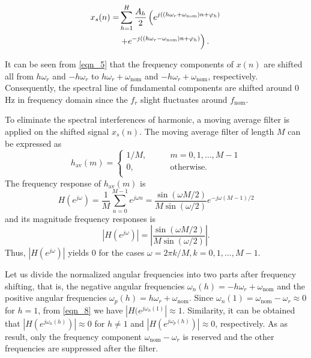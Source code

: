 \documentclass[journal,twoside]{IEEEtran}
\begin{document}
\begin{align}%
x_s(n)=&\sum_{h=1}^{H}\dfrac{A_h}{2}\left(e^{j\left((h\omega_r+\omega_\mathrm{nom})n+\varphi_h\right)}\right.\notag\\
&\left.+e^{-j\left((h\omega_r -\omega_\mathrm{nom})n+\varphi_h\right)}\right).\label{eqn_5}
\end{align}

It can be seen from  \eqref{eqn_5} that the frequency components of $x(n)$ are shifted all from $h\omega_r$ and $-h\omega_r$ to $h\omega_r+\omega_\mathrm{nom}$ and $-h\omega_r+\omega_\mathrm{nom}$, respectively. Consequently, the spectral line of fundamental components are shifted around 0 Hz in frequency domain since the $f_r$ slight fluctuates around $f_\mathrm{nom}$.

To eliminate the spectral interferences of harmonic, a moving average filter is applied on the shifted signal $x_s(n)$. The  moving average filter of length $M$ can be expressed as 
\begin{equation}
h_\mathrm{av}(m)=\begin{cases}
1/M,\qquad &m=0,1,\ldots,M-1\\
0, &\text{otherwise.}\\
\end{cases}\label{eqn_6}
\end{equation}
The frequency response of $h_\mathrm{av}(m)$ is
\begin{equation}
H(e^{j\omega})=\dfrac{1}{M}\sum_{n=0}^{M-1}e^{j\omega n}=\dfrac{\sin(\omega M/2)}{M\sin(\omega/2)}e^{-j\omega (M-1)/2}\label{eqn_7}
\end{equation}
and its magnitude frequency responses is
\begin{equation}
|H(e^{j\omega })|=\left|\dfrac{\sin(\omega M/2)}{M\sin(\omega/2)}\right|\mathrm{.}\label{eqn_8}
\end{equation}
Thus, $|H(e^{j\omega })|$ yields $0$ for the cases $\omega=2\pi k/M,k=0,1,\ldots,M-1$.

Let us divide the normalized angular frequencies into two parts after frequency shifting, that is, the negative angular frequencies $\omega_n(h)=-h\omega_r+\omega_\mathrm{nom}$ and the positive angular frequencies $\omega_p(h)=h\omega_r+\omega_\mathrm{nom}$. Since $\omega_n(1)=\omega_\mathrm{nom}-\omega_r\approx0$ for $h=1$, from \eqref{eqn_8} we have $|H(e^{j\omega_n(1)}|\approx1$. Similarity, it can be obtained that $|H(e^{j\omega_n(h)})|\approx0$ for $h\neq1$ and $|H(e^{j\omega_p(h)})|\approx0$, respectively. As as result, only the frequency component $\omega_\mathrm{nom}-\omega_r$ is reserved and the other frequencies are suppressed after the  filter.
\end{document}
